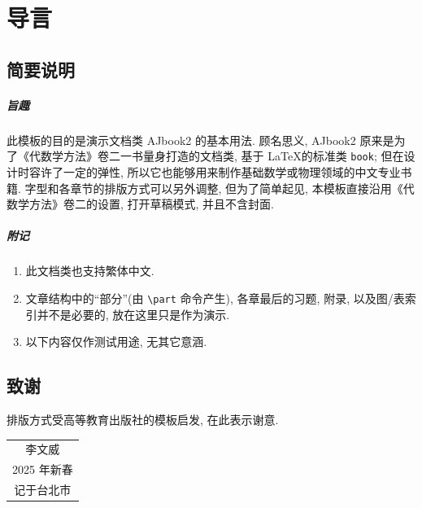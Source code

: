 \documentclass[
	draftmark = true,   %
	fontsetup = font-setup-open.tex,
	titlesetup = titles-setup.tex
]{AJbook2}
\numberwithin{equation}{section}
\begin{document}
	\frontmatter	%
	
	\mainmatter		%

	\chapter*{导言}
	\section*{简要说明}
	\paragraph*{旨趣}
	此模板的目的是演示文档类 \textsf{AJbook2} 的基本用法. 顾名思义, \textsf{AJbook2} 原来是为了《代数学方法》卷二一书量身打造的文档类, 基于 \LaTeX 的标准类 \texttt{book}; 但在设计时容许了一定的弹性, 所以它也能够用来制作基础数学或物理领域的中文专业书籍. 字型和各章节的排版方式可以另外调整, 但为了简单起见, 本模板直接沿用《代数学方法》卷二的设置, 打开草稿模式, 并且不含封面.

	\paragraph*{附记}
	\begin{enumerate}
		\item 此文档类也支持繁体中文.
		\item 文章结构中的``部分''(由 \texttt{\textbackslash part} 命令产生), 各章最后的习题, 附录, 以及图/表索引并不是必要的, 放在这里只是作为演示.
		\item 以下内容仅作测试用途, 无其它意涵.
	\end{enumerate}

	\section*{致谢}
	排版方式受高等教育出版社的模板启发, 在此表示谢意.

	\vspace{1em}
	\begin{flushright}\begin{minipage}{0.3 \textwidth}
		\begin{tabular}{c}
			{\kaishu 李文威} \\
			2025 年新春\\
			记于台北市
		\end{tabular}
	\end{minipage}\end{flushright}
\end{document}
